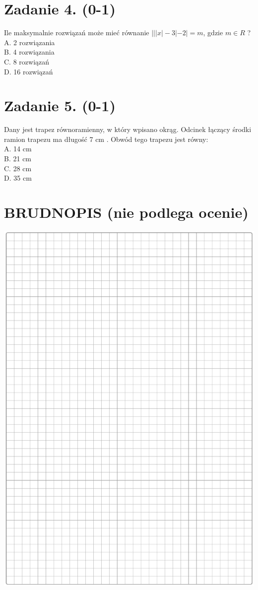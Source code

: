 \documentclass[10pt]{article}
\begin{document}
\section*{Zadanie 4. (0-1)}
Ile maksymalnie rozwiązań może mieć równanie \(|||x|-3|-2|=m\), gdzie \(m \in R\) ?\\
A. 2 rozwiązania\\
B. 4 rozwiązania\\
C. 8 rozwiązań\\
D. 16 rozwiązań

\section*{Zadanie 5. (0-1)}
Dany jest trapez równoramienny, w który wpisano okrąg. Odcinek łączący środki ramion trapezu ma długość 7 cm . Obwód tego trapezu jest równy:\\
A. 14 cm\\
B. 21 cm\\
C. 28 cm\\
D. 35 cm

\section*{BRUDNOPIS (nie podlega ocenie)}
\begin{center}
\includegraphics[max width=\textwidth]{2024_11_21_d15133c79177ee6989d3g-03}
\end{center}
\end{document}
